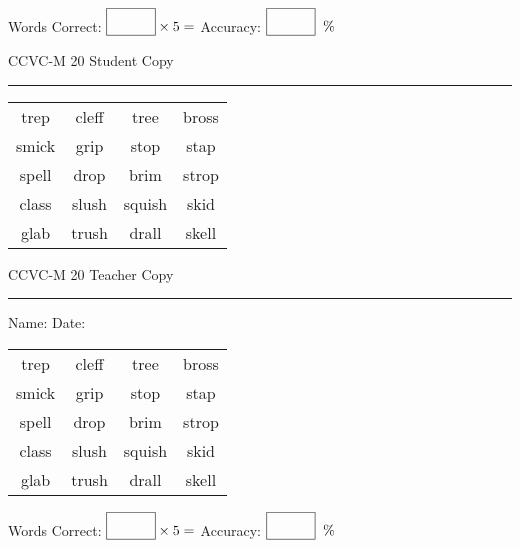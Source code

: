 \documentclass{memoir}
\begin{document}
\small

Words Correct: $\fbox{\phantom{\huge 100}} \times 5 = $ Accuracy: $\fbox{\phantom{\huge 100}}\;\; \%$ 

\vfill

\newpage



\footnotesize \noindent
CCVC-M 20 \hfill Student Copy
\smallskip
\hrule

\Large

\setlength{\tabcolsep}{14pt}
\def\arraystretch{3}

{\selectfont


\begin{vplace}[0.5]
\begin{center}
\begin{tabular}{cccc}
trep & cleff            & tree & bross       \\
smick & grip      & stop & stap \\
spell & drop & brim      & strop \\
class             & slush & squish & skid \\
glab & trush & drall & skell \\
\end{tabular}
\end{center}
\end{vplace}

}

\newpage

\footnotesize \noindent
CCVC-M 20 \hfill Teacher Copy
\smallskip
\hrule

\small

\vfill

\noindent
Name: \underline{\hspace{1.75in}} \hfill Date: \underline{\hspace{1in}}

\Large

{\selectfont


\begin{vplace}[0.5]
\begin{center}
\begin{tabular}{cccc}
trep & cleff            & tree & bross       \\
smick & grip      & stop & stap \\
spell & drop & brim      & strop \\
class             & slush & squish & skid \\
glab & trush & drall & skell \\
\end{tabular}
\end{center}
\end{vplace}



}

\small

Words Correct: $\fbox{\phantom{\huge 100}} \times 5 = $ Accuracy: $\fbox{\phantom{\huge 100}}\;\; \%$ 

\vfill

\end{document}
